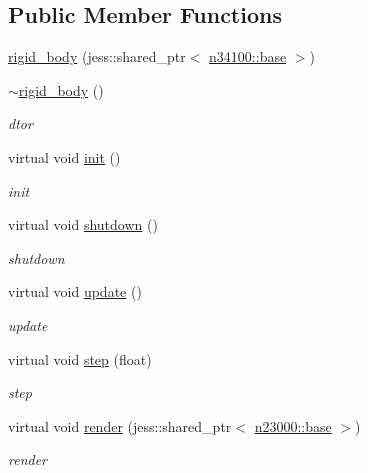 \subsection*{Public Member Functions}
\begin{DoxyCompactItemize}
\item 
\hyperlink{classnebula_1_1content_1_1actor_1_1physics_1_1rigid__body_a0bb7432214176e1f43ee3de3dfc9dfb8}{rigid\_\-body} (jess::shared\_\-ptr$<$ \hyperlink{classnebula_1_1content_1_1actor_1_1admin_1_1base}{n34100::base} $>$)
\item 
\hyperlink{classnebula_1_1content_1_1actor_1_1physics_1_1rigid__body_a008df6b4e7d84d31372d4a5b35e4871e}{$\sim$rigid\_\-body} ()
\begin{DoxyCompactList}\small\item\em dtor \item\end{DoxyCompactList}\item 
virtual void \hyperlink{classnebula_1_1content_1_1actor_1_1physics_1_1rigid__body_a858ee11f899acf3cc8f94eccf5713384}{init} ()
\begin{DoxyCompactList}\small\item\em init \item\end{DoxyCompactList}\item 
virtual void \hyperlink{classnebula_1_1content_1_1actor_1_1physics_1_1rigid__body_a99b70594f437d666ec7ee33e4d36c964}{shutdown} ()
\begin{DoxyCompactList}\small\item\em shutdown \item\end{DoxyCompactList}\item 
virtual void \hyperlink{classnebula_1_1content_1_1actor_1_1physics_1_1rigid__body_a7c8c0d4a581a36f3015912d1d73166f6}{update} ()
\begin{DoxyCompactList}\small\item\em update \item\end{DoxyCompactList}\item 
virtual void \hyperlink{classnebula_1_1content_1_1actor_1_1physics_1_1rigid__body_a480452963a16809aef9a8bd80bce1d16}{step} (float)
\begin{DoxyCompactList}\small\item\em step \item\end{DoxyCompactList}\item 
virtual void \hyperlink{classnebula_1_1content_1_1actor_1_1physics_1_1rigid__body_a60e13499d8c37d216d3f25415ef33041}{render} (jess::shared\_\-ptr$<$ \hyperlink{classnebula_1_1platform_1_1renderer_1_1base}{n23000::base} $>$)
\begin{DoxyCompactList}\small\item\em render \item\end{DoxyCompactList}\end{DoxyCompactItemize}
